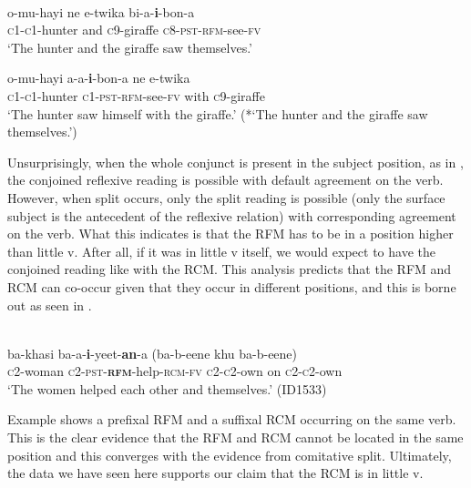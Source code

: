 \documentclass[output=paper]{langsci/langscibook}
\begin{document}
\ea\label{ex:safir:22}
  \\
\ea\label{ex:safir:22a}
\gll  o-mu-hayi   ne   e-twika   bi-a-\textbf{{i}}{-bon-a}  \\
       \textsc{c1-c1}-hunter   and   \textsc{c}9-giraffe   \textsc{c}8-\textsc{pst-}\textsc{rfm}-see-\textsc{fv} \\
\glt   ‘The hunter and the giraffe saw themselves.’

\ex\label{ex:safir:22b}
\gll  o-mu-hayi   a-a-\textbf{i}-bon-a     ne   e-twika \\
       \textsc{c1-c1}-hunter  \textsc{c}1-\textsc{pst-}\textsc{rfm}-see-\textsc{fv}   with   \textsc{c}9-giraffe \\
\glt   ‘The hunter saw himself with the giraffe.’
\glt   (*‘The hunter and the giraffe saw themselves.’)
\z
\z

Unsurprisingly, when the whole conjunct is present in the subject position, as in , the conjoined reflexive reading is possible with default agreement on the verb. However, when split occurs, only the split reading is possible (only the surface subject is the antecedent of the reflexive relation) with corresponding agreement on the verb. What this indicates is that the RFM has to be in a position higher than little v. After all, if it was in little v itself, we would expect  to have the conjoined reading like with the RCM. This analysis predicts that the RFM and RCM can co-occur given that they occur in different positions, and this is borne out as seen in .


\ea\label{ex:safir:23}
  \\
\gll ba-khasi   ba-a-\textbf{i}-yeet-\textbf{an}-a     (ba-b-eene khu ba-b-eene) \\
\textsc{c}2-woman   \textsc{c2-pst-}\textbf{\textsc{rfm}}-help-\textsc{rcm}\textsc{-fv}   \textsc{c2-c}2-own on  \textsc{c2-c2}-own\\
\glt ‘The women helped each other and themselves.’ (ID1533)
\z


Example  shows a prefixal RFM and a suffixal RCM occurring on the same verb. This is the clear evidence that the RFM and RCM cannot be located in the same position and this converges with the evidence from comitative split. Ultimately, the data we have seen here supports our claim that the RCM is in little v. 
\end{document}

